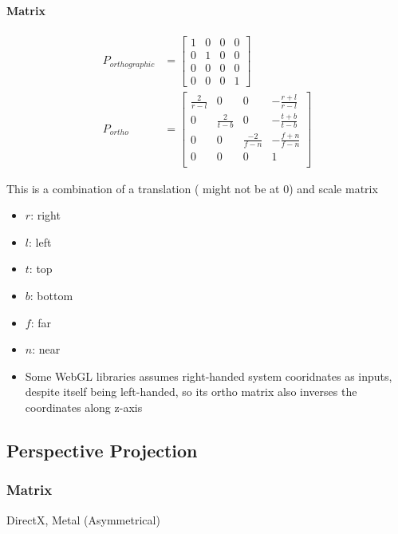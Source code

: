   \paragraph{Matrix}
  \begin{align}
    P_{orthographic} &=
    \begin{bmatrix}
      1 & 0 & 0 & 0 \\
      0 & 1 & 0 & 0 \\
      0 & 0 & 0 & 0 \\
      0 & 0 & 0 & 1
    \end{bmatrix} \\
    P_{ortho} &=
    \begin{bmatrix}
      \frac{2}{r - l} & 0 & 0 & -\frac{r + l}{r - l} \\
      0 & \frac{2}{t - b} & 0 & -\frac{t + b}{t - b} \\
      0 & 0 & \frac{-2}{f - n} & -\frac{f + n}{f - n} \\
      0 & 0 & 0 & 1 \\
    \end{bmatrix}
  \end{align}

  This is a combination of a translation ( might not be at 0)
  and scale matrix

  \begin{itemize}
    \item $ r $: right
    \item $ l $: left
    \item $ t $: top
    \item $ b $: bottom
    \item $ f $: far
    \item $ n $: near
    \item Some WebGL libraries assumes right-handed system cooridnates as
    inputs, despite itself being left-handed, so its ortho matrix also
    inverses the coordinates along z-axis
  \end{itemize}

\subsection{Perspective Projection}

  \subsubsection{Matrix}

    DirectX, Metal (Asymmetrical)

